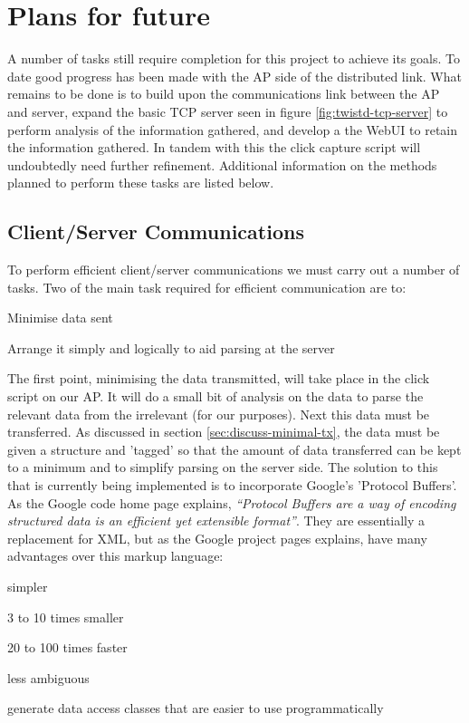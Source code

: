 \chapter{Plans for future}

A number of tasks still require completion for this project to achieve its goals. To date good progress has been made with the AP side of the distributed link. What remains to be done is to build upon the communications link between the AP and server, expand the basic TCP server seen in figure \ref{fig:twistd-tcp-server} to perform analysis of the information gathered, and develop a the WebUI to retain the information gathered. In tandem with this the click capture script will undoubtedly need further refinement. Additional information on the methods planned to perform these tasks are listed below.

\section{Client/Server Communications}

To perform efficient client/server communications we must carry out a number of tasks. Two of the main task required for efficient communication are to:
\begin{itemize*}
 \item Minimise data sent
 \item Arrange it simply and logically to aid parsing at the server
\end{itemize*}

The first point, minimising the data transmitted, will take place in the click script on our AP. It will do a small bit of analysis on the data to parse the relevant data from the irrelevant (for our purposes). Next this data must be transferred. As discussed in section \ref{sec:discuss-minimal-tx}, the data must be given a structure and 'tagged' so that the amount of data transferred can be kept to a minimum and to simplify parsing on  the server side. The solution to this that is currently being implemented is to incorporate Google's 'Protocol Buffers'. As the Google code home page explains, \textit{``Protocol Buffers are a way of encoding structured data is an efficient yet extensible format''}\cite{Goo}. They are essentially a replacement for XML, but as the Google project pages explains, have many advantages over this markup language:
\begin{itemize*}
 \item simpler
 \item 3 to 10 times smaller
 \item 20 to 100 times faster
 \item less ambiguous
 \item generate data access classes that are easier to use programmatically
\end{itemize*}

